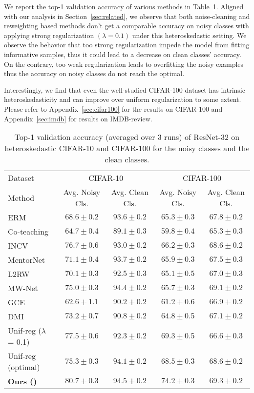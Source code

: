 We report the top-1 validation accuracy of various methods in Table~\ref{tab:CIFAR_full}. 
Aligned with our analysis in Section~\ref{sec:related}, we observe that both noise-cleaning and reweighting based methods don't get a comparable accuracy on noisy classes with applying strong regularization $(\lambda=0.1)$ under this heteroskedastic setting.
We observe the behavior that too strong regularization impede the model from fitting informative samples, thus it could lead to a decrease on clean classes' accuracy. On the contrary, too weak regularization leads to overfitting the noisy examples thus the accuracy on noisy classes do not reach the optimal.

Interestingly, we find that even the well-studied CIFAR-100 dataset has intrinsic heteroskedasticity and \ours{} can improve over uniform regularization to some extent. Please refer to Appendix~\ref{sec:cifar100} for the results on CIFAR-100 and Appendix~\ref{sec:imdb} for results on IMDB-review. 

\begin{table}[htpb]
\centering
\caption{Top-1 validation accuracy (averaged over 3 runs) of ResNet-32 on heteroskedastic CIFAR-10 and CIFAR-100 for the noisy classes and the clean classes.}
\label{tab:CIFAR_full}
{\small
\begin{tabular}{lcc|cc}
\toprule
Dataset             & \multicolumn{2}{c|}{CIFAR-10}        & \multicolumn{2}{c}{CIFAR-100}                \\
Method           &  Avg. Noisy Cls. &  Avg. Clean Cls.   & Avg. Noisy Cls. &  Avg. Clean Cls.   \\ \midrule
ERM & $68.6 \pm 0.2$ & $93.6 \pm 0.2$ & $65.3 \pm 0.3$ & $67.8\pm 0.2$ \\ 
Co-teaching & $64.7 \pm 0.4$ & $89.1 \pm 0.3$ & $59.8 \pm 0.4$ & $65.3 \pm 0.3$ \\ 
INCV & $76.7 \pm 0.6$ & $93.0 \pm 0.2$ & $66.2 \pm 0.3$ & $68.6 \pm 0.2$ \\ 
MentorNet & $71.1 \pm 0.4$ & $93.7 \pm 0.2$ & $65.9 \pm 0.3$ & $67.5 \pm 0.3$ \\ 
L2RW & $70.1 \pm 0.3$ & $92.5 \pm 0.3$ & $65.1 \pm 0.5$ & $67.0 \pm 0.3$ \\ 
MW-Net & $75.0 \pm 0.3$ & $94.4 \pm 0.2$ & $65.7 \pm 0.3$ & $69.1 \pm 0.2$ \\
GCE & $62.6 \pm 1.1$ & $90.2 \pm 0.2$ & $61.2 \pm 0.6$ & $66.9 \pm 0.2$ \\
DMI & $73.2 \pm 0.7$ & $90.8 \pm 0.2$ & $64.8 \pm 0.5$ & $67.1 \pm 0.2$ \\
\midrule
Unif-reg ($\lambda$ = 0.1) & $77.5 \pm 0.6$ & $92.3 \pm 0.2$ & $69.3 \pm 0.5$ & $66.6 \pm 0.3$ \\ 
Unif-reg (optimal) & $75.3 \pm 0.3$ & $94.1 \pm 0.2$ & $68.5 \pm 0.3$ & $68.6 \pm 0.2$ \\ 
\textbf{Ours (\ours{})} & $\mathbf{80.7 \pm 0.3}$ & $\mathbf{94.5 \pm 0.2}$ & $\mathbf{74.2 \pm 0.3}$ & $\mathbf{69.3 \pm 0.2}$ \\ 
\bottomrule
\end{tabular}}
\end{table}


